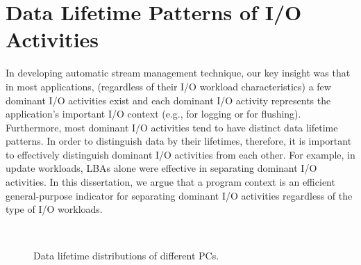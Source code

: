 \section{Data Lifetime Patterns of I/O Activities}
In developing automatic stream management technique, our key insight was that in most applications,
(regardless of their I/O workload characteristics)
a few dominant I/O activities exist
and each dominant I/O activity   
represents the application's important I/O context (e.g., for logging or for flushing). 
Furthermore, most dominant I/O activities tend to have distinct data lifetime patterns.
In order to distinguish data by their lifetimes, therefore, 
it is important to effectively distinguish dominant I/O activities from each other.  
For example, in update workloads, 
LBAs alone were effective in separating dominant I/O activities.  
In this dissertation, we argue that a program context is an efficient general-purpose
indicator for separating dominant I/O activities regardless of the type of I/O
workloads.  

\begin{figure}[t]
\centering
	\hspace{10pt}
	 \\
	\hspace{10pt}
\caption{Data lifetime distributions of different PCs.} 
\label{fig:types_and_PCs_}
\end{figure}


